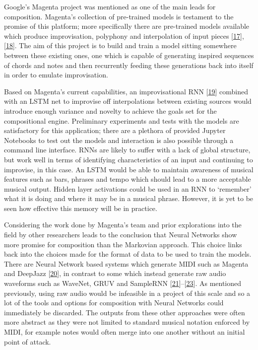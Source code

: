 \documentclass[12pt,]{article}
\begin{document}
Google's Magenta project was mentioned as one of the main leads for
composition. Magenta's collection of pre-trained models is testament to
the promise of this platform; more specifically there are pre-trained
models available which produce improvisation, polyphony and
interpolation of input pieces
{[}\protect\hyperlink{ref-magentavae}{17}{]},
{[}\protect\hyperlink{ref-magentapolyphony}{18}{]}. The aim of this
project is to build and train a model sitting somewhere between these
existing ones, one which is capable of generating inspired sequences of
chords and notes and then recurrently feeding these generations back
into itself in order to emulate improvisation.

Based on Magenta's current capabilities, an improvisational RNN
{[}\protect\hyperlink{ref-magentaimprov}{19}{]} combined with an LSTM
net to improvise off interpolations between existing sources would
introduce enough variance and novelty to achieve the goals set for the
compositional engine. Preliminary experiments and tests with the models
are satisfactory for this application; there are a plethora of provided
Jupyter Notebooks to test out the models and interaction is also
possible through a command line interface. RNNs are likely to suffer
with a lack of global structure, but work well in terms of identifying
characteristics of an input and continuing to improvise, in this case.
An LSTM would be able to maintain awareness of musical features such as
bars, phrases and tempo which should lead to a more acceptable musical
output. Hidden layer activations could be used in an RNN to `remember'
what it is doing and where it may be in a musical phrase. However, it is
yet to be seen how effective this memory will be in practice.

Considering the work done by Magenta's team and prior explorations into
the field by other researchers leads to the conclusion that Neural
Networks show more promise for composition than the Markovian approach.
This choice links back into the choices made for the format of data to
be used to train the models. There are Neural Network based systems
which generate MIDI such as Magenta and DeepJazz
{[}\protect\hyperlink{ref-deepjazz}{20}{]}, in contrast to some which
instead generate raw audio waveforms such as WaveNet, GRUV and SampleRNN
{[}\protect\hyperlink{ref-oord2016wavenet}{21}{]}--{[}\protect\hyperlink{ref-mehri2016samplernn}{23}{]}.
As mentioned previously, using raw audio would be infeasible in a
project of this scale and so a lot of the tools and options for
composition with Neural Networks could immediately be discarded. The
outputs from these other approaches were often more abstract as they
were not limited to standard musical notation enforced by MIDI, for
example notes would often merge into one another without an initial
point of attack.
\end{document}

